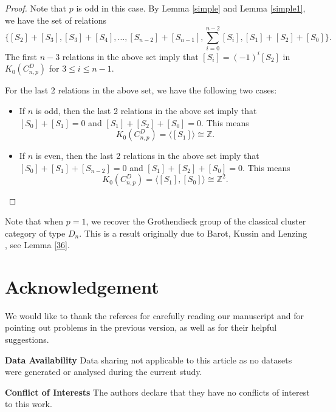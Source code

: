 \documentclass[a4paper,reqno,11pt]{amsart}
\theoremstyle{definition}
\begin{document}
\begin{proof}
Note that $p$ is odd in this case. By Lemma \ref{simple} and Lemma \ref{simple1}, we have the set of relations
	\[
	\{[S_2] + [S_3], [S_3] + [S_4], \ldots, [S_{n-2}] + [S_{n-1}], \sum_{i=0}^{n-2} [S_i], [S_1]+[S_2]+[S_0]\}.
	\]
	The first $n-3$ relations in the above set imply that $[S_i] = (-1)^{i}[S_2]$ in $K_0(C_{n,p}^D)$ for $3\leq i\leq n-1$.

	 For the last 2 relations in the above set, we have the following two cases:
\begin{itemize}
  \item [(1)] If $n$ is odd, then the last 2 relations in the above set imply that $[S_0]+[S_1]=0$ and $[S_1]+[S_2]+[S_0]=0$. This means
  $$K_0(C_{n,p}^D)=\langle[S_1]\rangle\cong\mathbb{Z}.$$
  \item [(2)]If $n$ is even, then the last 2 relations in the above set imply that $[S_0]+[S_1]+[S_{n-2}]=0$ and $[S_1]+[S_2]+[S_0]=0$. This means
  $$K_0(C_{n,p}^D)=\langle[S_1],[S_0]\rangle\cong\mathbb{Z}^2.$$
\end{itemize}
\end{proof}



Note that when $p=1$, we recover the Grothendieck group of the classical cluster category of type $D_n$. This is a result originally due to Barot, Kussin and Lenzing \cite{BKL}, see Lemma \ref{36}.
\vspace{3mm}





\section*{Acknowledgement}
We would like to thank the referees for carefully reading our manuscript and for pointing out problems in the previous version, as well as for their helpful suggestions.
\vspace{3mm}

\hspace{-4mm}\textbf{Data Availability}\hspace{2mm} Data sharing not applicable to this article as no datasets were generated or analysed during
the current study.
\vspace{2mm}

\hspace{-4mm}\textbf{Conflict of Interests}\hspace{2mm} The authors declare that they have no conflicts of interest to this work.
\end{document}
